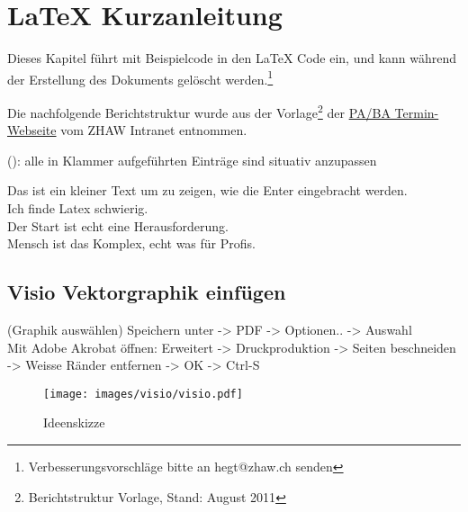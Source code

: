 
\chapter{LaTeX Kurzanleitung}\label{chap.anleitung}
Dieses Kapitel führt mit Beispielcode in den LaTeX Code ein, und kann während der Erstellung des Dokuments gelöscht werden.\footnote{Verbesserungsvorschläge bitte an hegt@zhaw.ch senden}

Die nachfolgende Berichtstruktur wurde aus der Vorlage\footnote{Berichtstruktur Vorlage, Stand: August 2011} der \href{https://intra.zhaw.ch/departemente/school-of-engineering/studium-standort-winterthur/studierende/projektarbeit-bachelorarbeit.html}{PA/BA Termin-Webseite} vom ZHAW Intranet entnommen.

(): alle in Klammer aufgeführten Einträge sind situativ anzupassen



Das ist ein kleiner Text um zu zeigen, wie die Enter eingebracht werden.\\
Ich finde Latex schwierig.\\
Der Start ist echt eine Herausforderung. \\
Mensch ist das Komplex, echt was für Profis. %



\section{Visio Vektorgraphik einfügen}\label{visio}
(Graphik auswählen) Speichern unter -> PDF -> Optionen.. -> Auswahl\\
Mit Adobe Akrobat öffnen: Erweitert -> Druckproduktion -> Seiten beschneiden -> Weisse Ränder entfernen -> OK -> Ctrl-S

\begin{figure}[H]
	\centering
		\texttt{[image: images/visio/visio.pdf]}
	\caption{Ideenskizze}
	\label{fig.Skizze}
\end{figure}

